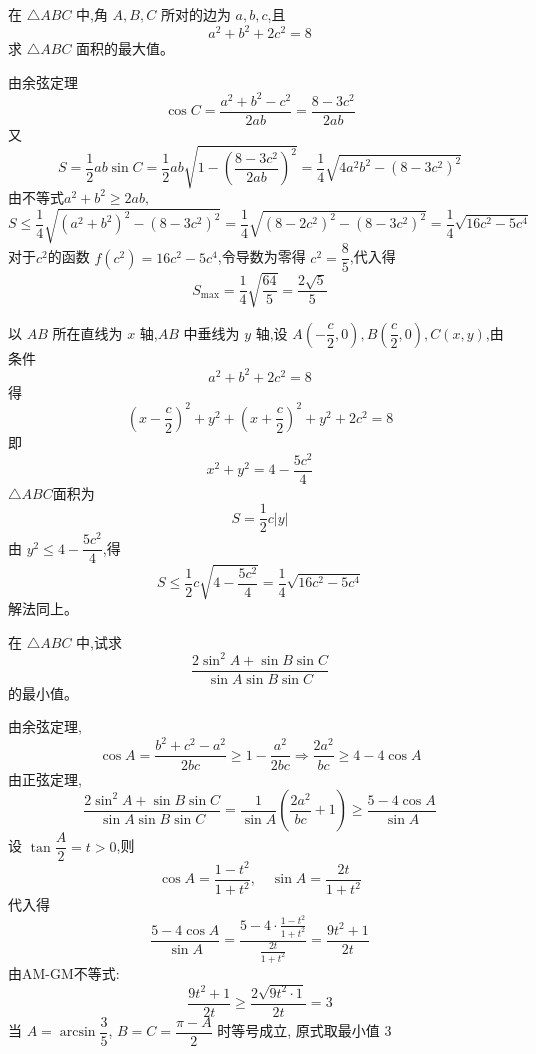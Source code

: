 \begin{questions}
    \question 在 $\triangle ABC$ 中,角 $A, B, C$ 所对的边为 $a, b, c$,且
    \[
    a^2 + b^2 + 2c^2 = 8
    \]
    求 $\triangle ABC$ 面积的最大值。
    \begin{solution}
        由余弦定理
        \[
        \cos C = \frac{a^2 + b^2 - c^2}{2ab}= \frac{8 - 3c^2}{2ab}
        \]
        又
        \[
        S = \frac{1}{2}ab\sin C = \frac{1}{2}ab\sqrt{1 - \left(\frac{8-3c^2}{2ab}\right)^2} = \frac{1}{4} \sqrt{4a^2b^2 - (8-3c^2)^2}
        \]
        由不等式$a^2+b^2\ge2ab,$
        \[
        S \leq \frac{1}{4} \sqrt{(a^2+b^2)^2 - (8-3c^2)^2}= \frac{1}{4} \sqrt{(8-2c^2)^2 - (8-3c^2)^2} = \frac{1}{4} \sqrt{16c^2 - 5c^4}
        \]
        对于$c^2$的函数 $f(c^2) = 16c^2 - 5c^4$,令导数为零得 $c^2 = \dfrac{8}{5}$,代入得
        \[
        S_{\text{max}} = \frac{1}{4} \sqrt{\frac{64}{5}} = \frac{2\sqrt{5}}{5}
        \]
    \end{solution}
    \begin{solution}
        以 $AB$ 所在直线为 $x$ 轴,$AB$ 中垂线为 $y$ 轴,设 $A(-\dfrac{c}{2},0),B(\dfrac{c}{2},0),C(x,y)$,由条件
        \[
        a^2 + b^2 + 2c^2 = 8
        \]
        得
        \[
        (x - \frac{c}{2})^2 + y^2 + (x + \frac{c}{2})^2 + y^2 + 2c^2 = 8
        \]
        即
        \[
        x^2 + y^2 = 4 - \frac{5c^2}{4}
        \]
        $\triangle ABC$面积为
        \[
        S = \frac{1}{2}c|y|
        \]
        由 $y^2 \leq 4 - \dfrac{5c^2}{4}$,得
        \[
        S \leq \frac{1}{2}c\sqrt{4 - \frac{5c^2}{4}} = \frac{1}{4}\sqrt{16c^2 - 5c^4}
        \]
        解法同上。
    \end{solution}
    
    \question  在 $\triangle ABC$ 中,试求$$\frac{2\sin^2 A + \sin B \sin C}{\sin A \sin B \sin C}$$ 的最小值。
    \begin{solution}
        由余弦定理,
        \[
        \cos A = \dfrac{b^2 + c^2 - a^2}{2bc}\ge 1 - \dfrac{a^2}{2bc}\Rightarrow \frac{2a^2}{bc} \ge 4 - 4\cos A
        \]
        由正弦定理,
        \[
        \frac{2\sin^2 A + \sin B \sin C}{\sin A \sin B \sin C}
        = \frac{1}{\sin A} \left( \frac{2a^2}{bc} + 1 \right)
        \ge \frac{5 - 4\cos A}{\sin A}
        \]
        设 $\tan \dfrac{A}{2} = t > 0$,则
        \[
        \cos A = \frac{1 - t^2}{1 + t^2},\quad \sin A = \frac{2t}{1 + t^2}
        \]
        代入得
        \[
        \frac{5 - 4\cos A}{\sin A}
        = \frac{5 - 4\cdot \frac{1 - t^2}{1 + t^2}}{\frac{2t}{1 + t^2}}
        = \frac{9t^2 + 1}{2t}
        \]
        由AM-GM不等式:
        \[
        \frac{9t^2 + 1}{2t} \ge \frac{2\sqrt{9t^2 \cdot 1}}{2t} = 3
        \]
        当 $A=\arcsin\dfrac{3}{5}$, $B=C=\dfrac{\pi-A}{2}$ 时等号成立, 原式取最小值 $3$
    \end{solution}
    

\end{questions}
